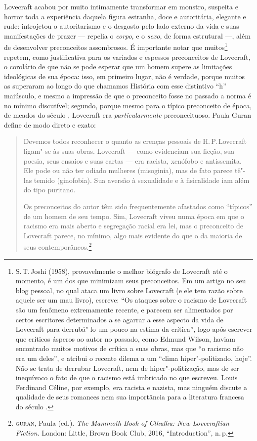 Lovecraft acabou por muito intimamente transformar em monstro, suspeita
e horror toda a experiência daquela figura estranha, doce e autoritária,
elegante e rude: introjetou o autoritarismo e o desgosto pelo lado
externo da vida e suas manifestações de prazer --- repelia o
\emph{corpo}, e o \emph{sexo}, de forma estrutural ---, além de
desenvolver preconceitos assombrosos. É importante notar que
muitos\footnote{S.\,T.\,Joshi (1958), provavelmente o melhor biógrafo de
  Lovecraft até o momento, é um dos que minimizam seus preconceitos. Em
  um artigo no seu blog pessoal, no qual ataca um livro sobre Lovecraft
  (e ele tem razão sobre aquele ser um mau livro), escreve: ``Os ataques
  sobre o racismo de Lovecraft são um fenômeno extremamente recente, e
  parecem ser alimentados por certos escritores determinados a se
  agarrar a esse aspecto da vida de Lovecraft para derrubá"-lo um pouco
  na estima da crítica'', logo após escrever que críticos ásperos ao
  autor no passado, como Edmund Wilson, haviam encontrado muitos motivos
  de crítica a suas obras, mas que ``o racismo não era um deles'', e
  atribui o recente dilema a um ``clima hiper"-politizado, hoje''. Não se
  trata de derrubar Lovecraft, nem de hiper"-politização, mas de ser
  inequívoco o fato de que o racismo está imbricado no que escreveu.
  Louis Ferdinand Céline, por exemplo, era racista e nazista, mas
  ninguém discute a qualidade de seus romances nem sua importância para
  a literatura francesa do século .} repetem, como justificativa para
os variados e espessos preconceitos de Lovecraft, o corolário de que não
se pode esperar que um homem supere as limitações ideológicas de sua
época: isso, em primeiro lugar, não é verdade, porque muitos as
superaram ao longo do que chamamos História com esse distintivo ``h''
maiúsculo, e mesmo a impressão de que o preconceito fosse no passado a
norma é no mínimo discutível; segundo, porque mesmo para o típico
preconceito de época, de meados do século , Lovecraft era
\emph{particularmente} preconceituoso. Paula Guran define de modo direto
e exato:

\begin{quote}
Devemos todos reconhecer o quanto as crenças pessoais de H.\,P.\,Lovecraft
ligam"-se às suas obras. Lovecraft --- como evidenciam sua ficção,
sua poesia, seus ensaios e suas cartas --- era racista, xenófobo e
antissemita. Ele pode ou não ter odiado mulheres (misoginia), mas de
fato parece tê"-las temido (ginofobia). Sua aversão à sexualidade e à
fisicalidade iam além do tipo puritano.

Os preconceitos do autor têm sido frequentemente afastados como
``típicos'' de um homem de seu tempo. Sim, Lovecraft viveu numa época em
que o racismo era mais aberto e segregação racial era lei, mas o
preconceito de Lovecraft parece, no mínimo, algo mais evidente do que o
da maioria de seus contemporâneos.\footnote{\textsc{guran}, Paula (ed.).
  \emph{The Mammoth Book of Cthulhu: New Lovecraftian Fiction}. London:
  Little, Brown Book Club, 2016, ``Introduction'', n.\,p.}
\end{quote}

